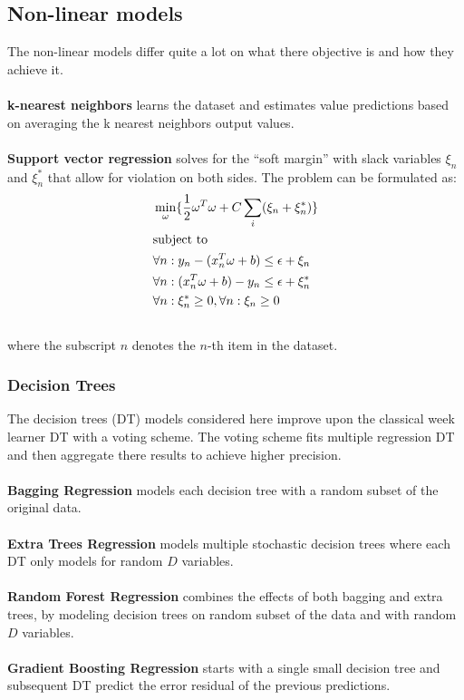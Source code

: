 \documentclass[a4paper]{article}
\begin{document}
\subsection{Non-linear models}
The non-linear models differ quite a lot on what there objective is and how they achieve it. \\\\
\textbf{k-nearest neighbors} learns the dataset and estimates value predictions based on averaging the k nearest neighbors output values. \\\\
\textbf{Support vector regression} solves for the “soft margin” with slack variables $\xi_n$ and $\xi_n^*$ that allow for violation on both sides. The problem can be formulated as:
\begin{align} \label{eq:5}
    &\min_{\omega} \{\frac{1}{2}\omega^T\omega + C\sum_i(\xi_n + \xi_n^*)\} \notag \\
&\text{subject to} \notag \\
    & \forall n : y_n - (x_n^T\omega + b) \leq \epsilon + \xi_n \notag \\
    & \forall n : (x_n^T\omega + b) - y_n\leq \epsilon + \xi_n^* \notag \\
    & \forall n : \xi_n^* \geq 0, \forall n : \xi_n \geq 0 \notag \\ \notag
\end{align} %
where the subscript $n$ denotes the $n$-th item in the dataset.
\subsubsection{Decision Trees}
The decision trees (DT) models considered here improve upon the classical week learner DT with a voting scheme. The voting scheme fits multiple regression DT and then aggregate there results to achieve higher precision. \\\\
\textbf{Bagging Regression} models each decision tree with a random subset of the original data. \\\\
\textbf{Extra Trees Regression} models multiple stochastic decision trees where each DT only models for random $D$ variables. \\\\
\textbf{Random Forest Regression} combines the effects of both bagging and extra trees, by modeling decision trees on random subset of the data and with random $D$ variables. \\\\
\textbf{Gradient Boosting Regression} starts with a single small decision tree and subsequent DT predict the error residual of the previous predictions.
\end{document}
